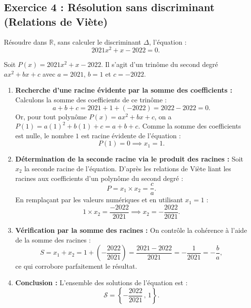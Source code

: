 \documentclass[11pt,a4paper]{article}
\newcommand{\R}{\mathbb{R}}
\begin{document}
\subsection*{Exercice 4 : Résolution sans discriminant (Relations de Viète)}
Résoudre dans $\R$, sans calculer le discriminant $\Delta$, l'équation :
\[
2021x^2 + x - 2022 = 0.
\]

\begin{correctionbox}
Soit $P(x) = 2021x^2 + x - 2022$. Il s'agit d'un trinôme du second degré $ax^2 + bx + c$ avec $a = 2021$, $b = 1$ et $c = -2022$.
\begin{enumerate}
    \item \textbf{Recherche d'une racine évidente par la somme des coefficients :}
    Calculons la somme des coefficients de ce trinôme :
    \[
    a + b + c = 2021 + 1 + (-2022) = 2022 - 2022 = 0.
    \]
    Or, pour tout polynôme $P(x) = ax^2 + bx + c$, on a $P(1) = a(1)^2 + b(1) + c = a + b + c$.
    Comme la somme des coefficients est nulle, le nombre $1$ est racine évidente de l'équation :
    \[
    P(1) = 0 \implies x_1 = 1.
    \]

    \item \textbf{Détermination de la seconde racine via le produit des racines :}
    Soit $x_2$ la seconde racine de l'équation. D'après les relations de Viète liant les racines aux coefficients d'un polynôme du second degré :
    \[
    P = x_1 \times x_2 = \frac{c}{a}.
    \]
    En remplaçant par les valeurs numériques et en utilisant $x_1 = 1$ :
    \[
    1 \times x_2 = \frac{-2022}{2021} \implies x_2 = -\frac{2022}{2021}.
    \]

    \item \textbf{Vérification par la somme des racines :}
    On contrôle la cohérence à l'aide de la somme des racines :
    \[
    S = x_1 + x_2 = 1 + \left(-\frac{2022}{2021}\right) = \frac{2021 - 2022}{2021} = -\frac{1}{2021} = -\frac{b}{a},
    \]
    ce qui corrobore parfaitement le résultat.

    \item \textbf{Conclusion :}
    L'ensemble des solutions de l'équation est :
    \[
    \mathcal{S} = \left\{ -\frac{2022}{2021}\,,\, 1 \right\}.
    \]
\end{enumerate}
\end{correctionbox}

\end{document}

